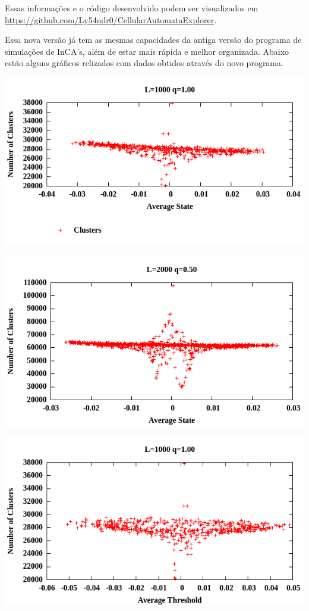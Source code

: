 \documentclass[12pt,a4paper,final]{article}
\begin{document}
Essas informações e o código desenvolvido podem ser visualizados em \url{https://github.com/Ly54ndr0/CellularAutomataExplorer}.

Essa nova versão já tem as mesmas capacidades da antiga versão do programa de simulações de InCA's, além de estar mais rápida e melhor organizada. Abaixo estão alguns gráficos relizados com dados obtidos através do novo programa.

\includegraphics[width=\linewidth]{dataL1000Q100ClustersVsAvgState.png}

\includegraphics[width=\linewidth]{dataL2000Q50ClustersVsAvgState.png}

\includegraphics[width=\linewidth]{dataL1000Q100ClustersVsAvgThres.png}
\end{document}
